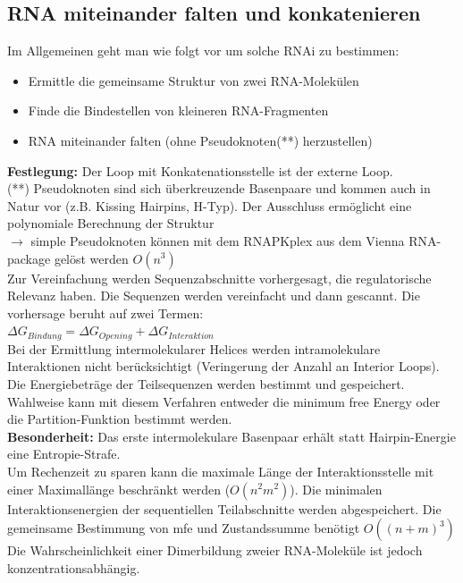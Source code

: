 \subsection{RNA miteinander falten und konkatenieren}

Im Allgemeinen geht man wie folgt vor um solche RNAi zu bestimmen:
\begin{itemize}
\item Ermittle die gemeinsame Struktur von zwei RNA-Molekülen
\item Finde die Bindestellen von kleineren RNA-Fragmenten
\item RNA miteinander falten (ohne Pseudoknoten(**) herzustellen)
\end{itemize}  
\textbf{Festlegung:} Der Loop mit Konkatenationsstelle ist der externe Loop. \\
(**) Pseudoknoten sind sich überkreuzende Basenpaare und kommen auch in Natur vor (z.B. Kissing Hairpins, H-Typ). Der Ausschluss ermöglicht eine polynomiale Berechnung der Struktur \\
$\rightarrow$ simple Pseudoknoten können mit dem RNAPKplex aus dem Vienna RNA-package gelöst werden $O(n^3)$ \\

Zur Vereinfachung werden Sequenzabschnitte vorhergesagt, die regulatorische Relevanz haben. Die Sequenzen werden vereinfacht und dann gescannt. Die vorhersage beruht auf zwei Termen:\\
$\Delta G_{Bindung} = \Delta G_{Opening} + \Delta G_{Interaktion}$\\
Bei der Ermittlung intermolekularer Helices werden intramolekulare Interaktionen nicht berücksichtigt (Veringerung der Anzahl an Interior Loops). Die Energiebeträge der Teilsequenzen werden bestimmt und gespeichert. Wahlweise kann mit diesem Verfahren entweder die minimum free Energy oder die Partition-Funktion bestimmt werden.\\
\textbf{Besonderheit:} Das erste intermolekulare Basenpaar erhält statt Hairpin-Energie eine Entropie-Strafe.\\
Um Rechenzeit zu sparen kann die maximale Länge der Interaktionsstelle mit einer Maximallänge beschränkt werden ($O(n^2m^2)$). Die minimalen Interaktionsenergien der sequentiellen Teilabschnitte werden abgespeichert. Die gemeinsame Bestimmung von mfe und Zustandssumme benötigt $O((n+m)^3)$\\ 
Die Wahrscheinlichkeit einer Dimerbildung zweier RNA-Moleküle ist jedoch konzentrationsabhängig.

